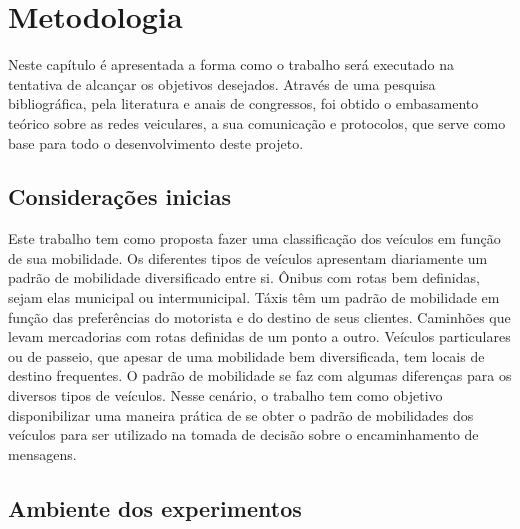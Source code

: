 \documentclass[mestrado, pre-defesa, english, brazil]{packages/icmc}
\begin{document}

\chapter{Metodologia} \label{metodologia}

Neste capítulo é apresentada a forma como o trabalho será executado na tentativa de alcançar os objetivos desejados. Através de uma pesquisa bibliográfica, pela literatura e anais de congressos, foi obtido o embasamento teórico sobre as redes veiculares, a sua comunicação e protocolos, que serve como base para todo o desenvolvimento deste projeto.


\section{Considerações inicias}\label{proposta trabalho}

Este trabalho tem como proposta fazer uma classificação dos veículos em função de sua mobilidade. Os diferentes tipos de veículos apresentam diariamente um padrão de mobilidade diversificado entre si. Ônibus com rotas bem definidas, sejam elas municipal ou intermunicipal. Táxis têm um padrão de mobilidade em função das preferências do motorista e do destino de seus clientes. Caminhões que levam mercadorias com rotas definidas de um ponto a outro. Veículos particulares ou de passeio, que apesar de uma mobilidade bem diversificada, tem locais de destino frequentes. O padrão de mobilidade se faz com algumas diferenças para os diversos tipos de veículos. Nesse cenário, o trabalho tem como objetivo disponibilizar uma maneira prática de se obter o padrão de mobilidades dos veículos para ser utilizado na tomada de decisão sobre o encaminhamento de mensagens.

\section{Ambiente dos experimentos}
\end{document}

